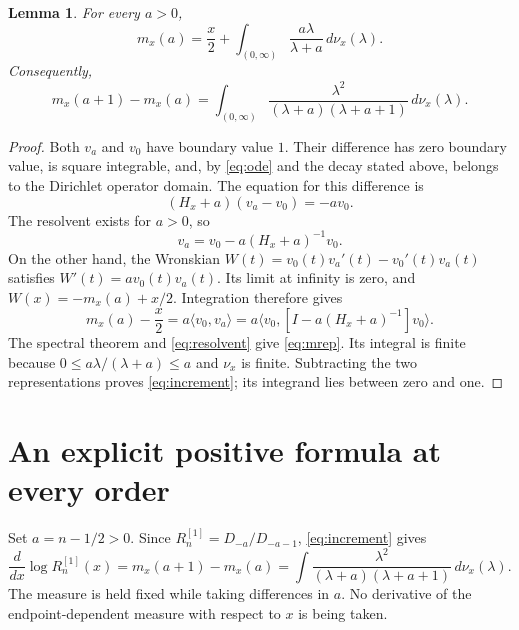 \documentclass[11pt]{article}
\newtheorem{lemma}{Lemma}
\newcommand{\dd}{\,d}
\begin{document}
\begin{lemma}\label{lem:weyl}
For every $a>0$,
\begin{equation}\label{eq:mrep}
 m_x(a)=\frac x2+
 \int_{(0,\infty)}\frac{a\lambda}{\lambda+a}\dd\nu_x(\lambda).
\end{equation}
Consequently,
\begin{equation}\label{eq:increment}
 m_x(a+1)-m_x(a)=
 \int_{(0,\infty)}
 \frac{\lambda^2}{(\lambda+a)(\lambda+a+1)}\dd\nu_x(\lambda).
\end{equation}
\end{lemma}
\begin{proof}
Both $v_a$ and $v_0$ have boundary value $1$. Their difference has zero
boundary value, is square integrable, and, by \eqref{eq:ode} and the
decay stated above, belongs to the Dirichlet operator domain. The equation
for this difference is
\[
 (H_x+a)(v_a-v_0)=-a v_0.
\]
The resolvent exists for $a>0$, so
\begin{equation}\label{eq:resolvent}
 v_a=v_0-a(H_x+a)^{-1}v_0.
\end{equation}
On the other hand, the Wronskian
$W(t)=v_0(t)v_a'(t)-v_0'(t)v_a(t)$ satisfies
$W'(t)=a v_0(t)v_a(t)$. Its limit at infinity is zero, and
$W(x)=-m_x(a)+x/2$. Integration therefore gives
\[
 m_x(a)-\frac x2
 =a\langle v_0,v_a\rangle
 =a\langle v_0,[I-a(H_x+a)^{-1}]v_0\rangle.
\]
The spectral theorem and \eqref{eq:resolvent} give \eqref{eq:mrep}.
Its integral is finite because $0\le a\lambda/(\lambda+a)\le a$ and
$\nu_x$ is finite. Subtracting the two representations proves
\eqref{eq:increment}; its integrand lies between zero and one.
\end{proof}

\section*{An explicit positive formula at every order}
Set $a=n-1/2>0$. Since $R_n^{[1]}=D_{-a}/D_{-a-1}$,
\eqref{eq:increment} gives
\begin{equation}\label{eq:base}
 \frac{d}{dx}\log R_n^{[1]}(x)
 =m_x(a+1)-m_x(a)
 =\int\frac{\lambda^2}{(\lambda+a)(\lambda+a+1)}\dd\nu_x(\lambda).
\end{equation}
The measure is held fixed while taking differences in $a$. No derivative
of the endpoint-dependent measure with respect to $x$ is being taken.
\end{document}
